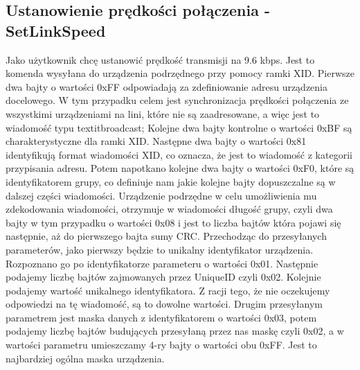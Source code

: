 		\subsection{Ustanowienie prędkości połączenia - SetLinkSpeed}
			Jako użytkownik chcę ustanowić prędkość transmisji na 9.6 kbps.
			\newline\newline
			Jest to komenda wysyłana do urządzenia podrzędnego przy pomocy ramki XID.
			\newline
			Pierwsze dwa bajty o wartości 0xFF odpowiadają za zdefiniowanie adresu urządzenia docelowego. 
			W tym przypadku celem jest synchronizacja prędkości połączenia ze wszystkimi urządzeniami na lini, które nie są zaadresowane, a więc jest to wiadomość typu textit{broadcast};
			\newline
			Kolejne dwa bajty kontrolne o wartości 0xBF są charakterystyczne dla ramki XID.
			\newline
			Następne dwa bajty o wartości 0x81 identyfikują format wiadomości XID, co oznacza, że jest to wiadomość z kategorii przypisania adresu.
			\newline
			Potem napotkano kolejne dwa bajty o wartości 0xF0, które są identyfikatorem grupy, co definiuje nam jakie kolejne bajty dopuszczalne są w dalszej części wiadomości.
			\newline
			Urządzenie podrzędne w celu umożliwienia mu zdekodowania wiadomości, otrzymuje w wiadomości długość grupy, czyli dwa bajty w tym przypadku o wartości 0x08 i jest to 
			liczba bajtów która pojawi się następnie, aż do pierwszego bajta sumy CRC.
			\newline
			Przechodząc do przesyłanych parameterów, jako pierwszy będzie to unikalny identyfikator urządzenia. Rozpoznano go po identyfikatorze parameteru o wartości 0x01.
			Następnie podajemy liczbę bajtów zajmowanych przez UniqueID czyli 0x02. Kolejnie podajemy wartość unikalnego identyfikatora. Z racji tego, że nie oczekujemy odpowiedzi
			na tę wiadomość, są to dowolne wartości.
			Drugim przesyłanym parametrem jest maska danych z identyfikatorem o wartości 0x03, potem podajemy liczbę bajtów budujących przesyłaną przez nas maskę czyli 0x02, a w wartości 
			parametru umieszczamy 4-ry bajty o wartości obu 0xFF. Jest to najbardziej ogólna maska urządzenia.
